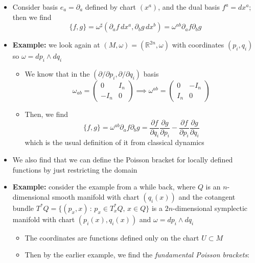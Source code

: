 \documentclass[12pt,a4paper]{article}
\numberwithin{equation}{section}
\begin{document}
\begin{itemize}
		\item Consider basis $e_{a}=\partial_{a}$ defined by chart $(x^{a})$, and the dual basis $f^{a}=dx^{a}$; then we find
		\begin{equation}
			\{f,g\}=\omega^{\sharp}\left(\partial_{a}f\,dx^{a},\partial_{b}g\,dx^{b}\right)=\omega^{ab}\partial_{a}f\partial_{b}g
		\end{equation}
		\item \textbf{Example:} we look again at $(M,\omega)=(\mathbb{R}^{2n},\omega)$ with coordinates $(p_{i},q_{i})$ so $\omega = dp_{i}\wedge dq_{i}$
		\begin{itemize}
			\item We know that in the $(\partial/\partial p_{i},\partial/\partial q_{i})$ basis
			\begin{equation}
				\omega_{ab}=\begin{pmatrix}0&I_{n}\\-I_{n}&0\end{pmatrix}\implies \omega^{ab}=\begin{pmatrix}0&-I_{n}\\I_{n}&0\end{pmatrix}
			\end{equation}
			\item Then, we find
			\begin{equation}
				\{f,g\}=\omega^{ab}\partial_{a}f\partial_{b}g=\frac{\partial f}{\partial q_{i}}\frac{\partial g}{\partial p_{i}}-\frac{\partial f}{\partial p_{i}}\frac{\partial g}{\partial q_{i}}
			\end{equation}
			which is the usual definition of it from classical dynamics
		\end{itemize}
		\item We also find that we can define the Poisson bracket for locally defined functions by just restricting the domain
		\item \textbf{Example:} consider the example from a while back, where $Q$ is an $n$-dimensional smooth manifold with chart $(q_{i}(x))$ and the cotangent bundle $T^{*}Q=\{(p_{x},x)\,:\,p_{x}\in T^{*}_{x}Q,\,x\in Q\}$ is a $2n$-dimensional symplectic manifold with chart $(p_{i}(x),q_{i}(x))$ and $\omega=dp_{i}\wedge dq_{i}$
		\begin{itemize}
			\item The coordinates are functions defined only on the chart $U\subset M$
			\item Then by the earlier example, we find the \textit{fundamental Poisson brackets}:
			\begin{equation}

\end{equation}
\end{itemize}
\end{itemize}
\end{document}
